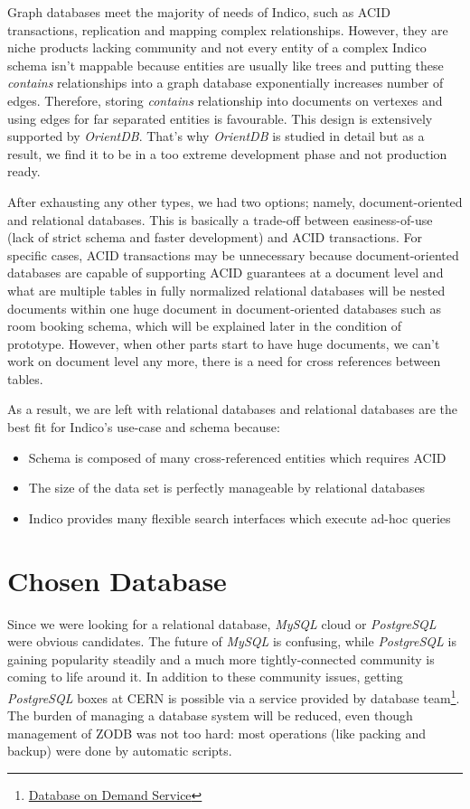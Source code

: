 Graph databases meet the majority of needs of Indico, such as ACID transactions, replication and mapping complex relationships. However, they are niche products lacking community and not every entity of a complex Indico schema isn't mappable because entities are usually like trees and putting these \textit{contains} relationships into a graph database exponentially increases number of edges. Therefore, storing \textit{contains} relationship into documents on vertexes and using edges for far separated entities is favourable. This design is extensively supported by \textit{OrientDB}. That's why \textit{OrientDB} is studied in detail but as a result, we find it to be in a too extreme development phase and not production ready. 

After exhausting any other types, we had two options; namely, document-oriented and relational databases. This is basically a trade-off between easiness-of-use (lack of strict schema and faster development) and ACID transactions. For specific cases, ACID transactions may be unnecessary because document-oriented databases are capable of supporting ACID guarantees at a document level and what are multiple tables in fully normalized relational databases will be nested documents within one huge document in document-oriented databases such as room booking schema, which will be explained later in the condition of prototype. However, when other parts start to have huge documents, we can't work on document level any more, there is a need for cross references between tables.

As a result, we are left with relational databases and relational databases are the best fit for Indico's use-case and schema because:

\begin{itemize}
  \item Schema is composed of many cross-referenced entities which requires ACID
  \item The size of the data set is perfectly manageable by relational databases
  \item Indico provides many flexible search interfaces which execute ad-hoc queries 
\end{itemize}

\section{Chosen Database}

Since we were looking for a relational database, \textit{MySQL} cloud or \textit{PostgreSQL} were obvious candidates. The future of \textit{MySQL} is confusing, while \textit{PostgreSQL} is gaining popularity steadily and a much more tightly-connected community is coming to life around it. In addition to these community issues, getting \textit{PostgreSQL} boxes at CERN is possible via a service provided by database team\footnote{\href{http://information-technology.web.cern.ch/services/database-on-demand}{Database on Demand Service}}. The burden of managing a database system will be reduced, even though management of ZODB was not too hard: most operations (like packing and backup) were done by automatic scripts.

